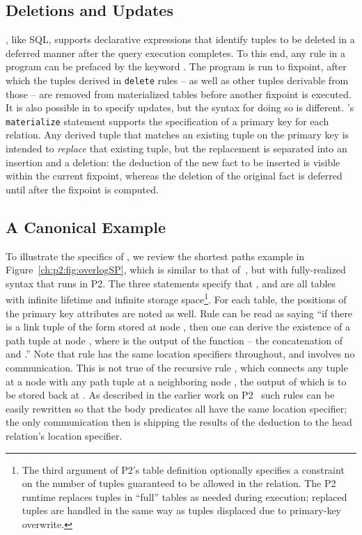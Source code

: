 \subsection{Deletions and Updates}

\OVERLOG, like SQL, supports declarative expressions that identify tuples to be
deleted in a deferred manner after the query execution completes.  To this end, any
\OVERLOG rule in a program can be prefaced by the keyword .  The
program is run to fixpoint, after which the tuples derived in {\tt delete}
rules -- as well as other tuples derivable from those -- are removed from
materialized tables before another fixpoint is executed.  It is also possible
in \OVERLOG to specify updates, but the syntax for doing so is different.
\OVERLOG's {\tt materialize} statement supports the specification of a primary
key for each relation.  Any derived tuple that matches an existing tuple on the
primary key is intended to {\em replace} that existing tuple, but the
replacement is separated into an insertion and a deletion: the deduction of the
new fact to be inserted is visible within the current fixpoint, whereas the
deletion of the original fact is deferred until after the fixpoint is computed.

\subsection{A Canonical Example}
\label{ch:p2:sec:declnet}

To illustrate the specifics of \OVERLOG, we review the shortest paths example
in Figure~\ref{ch:p2:fig:overlogSP}, which is similar to that
of~\cite{loo-sigmod06}, but with fully-realized \OVERLOG syntax that runs in
P2.  The three  statements specify that , 
and  are all tables with infinite lifetime and infinite storage
space\footnote{The third argument of P2's table definition optionally specifies
a constraint on the number of tuples guaranteed to be allowed in the relation.
The P2 runtime replaces tuples in ``full'' tables as needed during execution;
replaced tuples are handled in the same way as tuples displaced due to
primary-key overwrite.}.  For each table, the positions of the primary key
attributes are noted as well.  Rule  can be read as saying ``if there is
a link tuple of the form  stored at node , then one can
derive the existence of a path tuple  at node , where
 is the output of the function  -- the concatenation of
 and .'' Note that rule  has the same location specifiers
throughout, and involves no communication.  This is not true of the recursive
rule , which connects any  tuple at a node  with any path
tuple at a neighboring node , the output of which is to be stored back at
.  As described in the earlier work on
P2~\cite{loo-sigcomm05,loo-sigmod06} such rules can be easily rewritten so that
the body predicates all have the same location specifier; the only
communication then is shipping the results of the deduction to the head
relation's location specifier.

